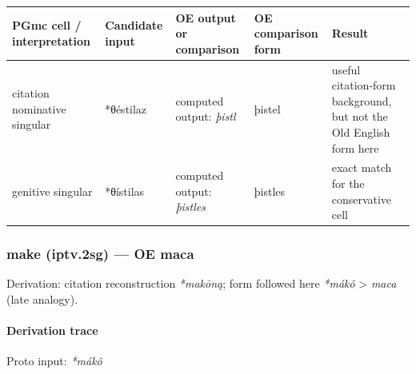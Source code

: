 \documentclass[
  british,
  a4paper,
]{article}
\newcounter{none} %
\begin{document}
{\def\LTcaptype{none} %
\begin{longtable}[]{@{}
  >{\raggedright\arraybackslash}p{}
  >{\raggedright\arraybackslash}p{}
  >{\raggedright\arraybackslash}p{}
  >{\raggedright\arraybackslash}p{}
  >{\raggedright\arraybackslash}p{}@{}}
\toprule\noalign{}
\begin{minipage}[b]{\linewidth}\raggedright
PGmc cell / interpretation
\end{minipage} & \begin{minipage}[b]{\linewidth}\raggedright
Candidate input
\end{minipage} & \begin{minipage}[b]{\linewidth}\raggedright
OE output or comparison
\end{minipage} & \begin{minipage}[b]{\linewidth}\raggedright
OE comparison form
\end{minipage} & \begin{minipage}[b]{\linewidth}\raggedright
Result
\end{minipage} \\
\midrule\noalign{}
\endhead
\bottomrule\noalign{}
\endlastfoot
citation nominative singular & *θéstilaz & computed output: \emph{þistl}
& þistel & useful citation-form background, but not the Old English form
here \\
genitive singular & *θístilas & computed output: \emph{þistles} &
þistles & exact match for the conservative cell \\
\end{longtable}
}

\subsubsection{make (iptv.2sg) --- OE maca}\label{make-iptv.2sg-oe-maca}

Derivation: citation reconstruction \emph{*makōną}; form followed here
\emph{*mákô} \textgreater{} \emph{maca} (late analogy).

\paragraph{Derivation trace}\label{derivation-trace-57}

Proto input: \emph{*mákô}
\end{document}
